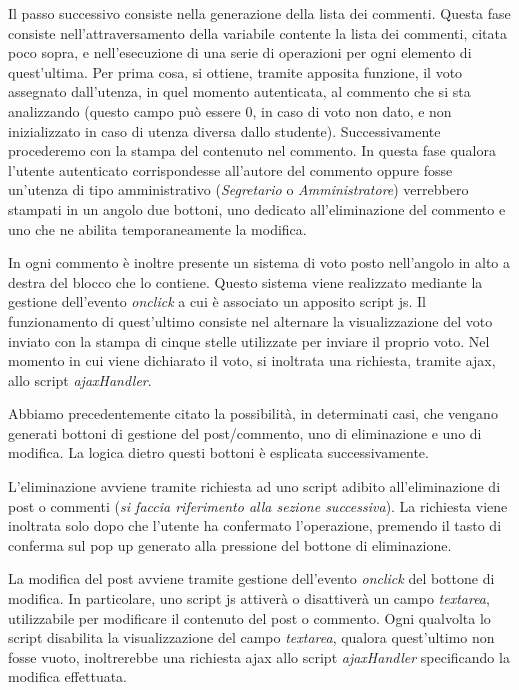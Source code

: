 \documentclass [a4paper,11pt]{book}
\begin{document}
Il passo successivo consiste nella generazione della lista dei commenti. Questa fase consiste nell'attraversamento della variabile contente la lista dei commenti, citata poco sopra, e nell'esecuzione di una serie di operazioni per ogni elemento di quest'ultima. Per prima cosa, si ottiene, tramite apposita funzione, il voto assegnato dall'utenza, in quel momento autenticata, al commento che si sta analizzando (questo campo può essere 0, in caso di voto non dato, e non inizializzato in caso di utenza diversa dallo studente).
Successivamente procederemo con la stampa del contenuto nel commento.
In questa fase qualora l'utente autenticato corrispondesse all'autore del commento oppure fosse un'utenza di tipo amministrativo (\emph{Segretario} o \emph{Amministratore}) verrebbero stampati in un angolo due bottoni, uno dedicato all'eliminazione del commento e uno che ne abilita temporaneamente la modifica.

In ogni commento è inoltre presente un sistema di voto posto nell'angolo in alto a destra del blocco che lo contiene. Questo sistema viene realizzato mediante la gestione dell'evento \emph{onclick} a cui è associato un apposito script js. Il funzionamento di quest'ultimo consiste nel alternare la visualizzazione del voto inviato con la stampa di cinque stelle utilizzate per inviare il proprio voto. Nel momento in cui viene dichiarato il voto, si inoltrata una richiesta, tramite ajax, allo script \emph{ajaxHandler}. 

Abbiamo precedentemente citato la possibilità, in determinati casi, che vengano generati bottoni di gestione del post/commento, uno di eliminazione e uno di modifica.
La logica dietro questi bottoni è esplicata successivamente.

L'eliminazione avviene tramite richiesta ad uno script adibito all'eliminazione di post o commenti (\emph{si faccia riferimento alla sezione successiva}). La richiesta viene inoltrata solo dopo che l'utente ha confermato l'operazione, premendo il tasto di conferma sul pop up generato alla pressione del bottone di eliminazione.

La modifica del post avviene tramite gestione dell'evento \emph{onclick} del bottone di modifica. In particolare, uno script js attiverà o disattiverà un campo \emph{textarea}, utilizzabile per modificare il contenuto del post o commento. Ogni qualvolta lo script disabilita la visualizzazione del campo \emph{textarea}, qualora quest'ultimo non fosse vuoto, inoltrerebbe una richiesta ajax allo script \emph{ajaxHandler} specificando la modifica effettuata.
\end{document}
